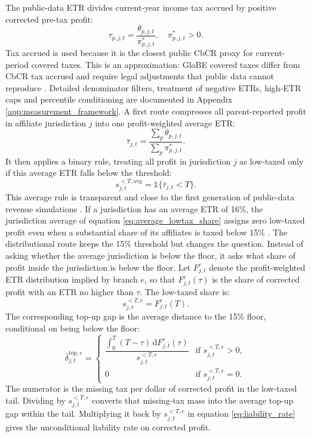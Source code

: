 \documentclass[11pt,a4paper]{article}
\begin{document}
The public-data ETR divides current-year income tax accrued by positive corrected pre-tax profit:
\begin{equation}\label{eq:etr}
\tau_{p,j,t}=\frac{\theta_{p,j,t}}{\pi^{*}_{p,j,t}},\quad \pi^{*}_{p,j,t}>0.
\end{equation}
Tax accrued is used because it is the closest public CbCR proxy for current-period covered taxes. This is an approximation: GloBE covered taxes differ from CbCR tax accrued and require legal adjustments that public data cannot reproduce \citep{oecd2025,hanlon2023}. Detailed denominator filters, treatment of negative ETRs, high-ETR caps and percentile conditioning are documented in Appendix \ref{app:measurement_framework}. A first route compresses all parent-reported profit in affiliate jurisdiction $j$ into one profit-weighted average ETR:
\begin{equation}\label{eq:avg_etr}
\bar{\tau}_{j,t}=\frac{\sum_p \theta_{p,j,t}}{\sum_p \pi^{*}_{p,j,t}}.
\end{equation}
It then applies a binary rule, treating all profit in jurisdiction $j$ as low-taxed only if this average ETR falls below the threshold:
\begin{equation}\label{eq:average_lowtax_share}
s_{j,t}^{<T,\text{avg}}=\mathbb{1}\{\bar{\tau}_{j,t}<T\}.
\end{equation}
This average rule is transparent and close to the first generation of public-data revenue simulations \citep{barake2022}. If a jurisdiction has an average ETR of 16\%, the jurisdiction average of equation \eqref{eq:average_lowtax_share} assigns zero low-taxed profit even when a substantial share of its affiliates is taxed below 15\% \citep{hugger2026}. The distributional route keeps the 15\% threshold but changes the question. Instead of asking whether the average jurisdiction is below the floor, it asks what share of profit inside the jurisdiction is below the floor. Let $F_{j,t}^{e}$ denote the profit-weighted ETR distribution implied by branch $e$, so that $F_{j,t}^{e}(\tau)$ is the share of corrected profit with an ETR no higher than $\tau$. The low-taxed share is:
\begin{equation}\label{eq:lowtax_share}
s_{j,t}^{<T,e}=F_{j,t}^{e}(T).
\end{equation}
The corresponding top-up gap is the average distance to the 15\% floor, conditional on being below the floor:
\begin{equation}\label{eq:topup_gap}
\bar{\delta}_{j,t}^{\text{top},e}=
\begin{cases}
\dfrac{\int_{0}^{T}(T-\tau)\,\mathrm{d}F_{j,t}^{e}(\tau)}{s_{j,t}^{<T,e}} & \text{if } s_{j,t}^{<T,e}>0,\\[8pt]
0 & \text{if } s_{j,t}^{<T,e}=0.
\end{cases}
\end{equation}
The numerator is the missing tax per dollar of corrected profit in the low-taxed tail. Dividing by $s_{j,t}^{<T,e}$ converts that missing-tax mass into the average top-up gap within the tail. Multiplying it back by $s_{j,t}^{<T,e}$ in equation \eqref{eq:liability_rate} gives the unconditional liability rate on corrected profit.
\end{document}
